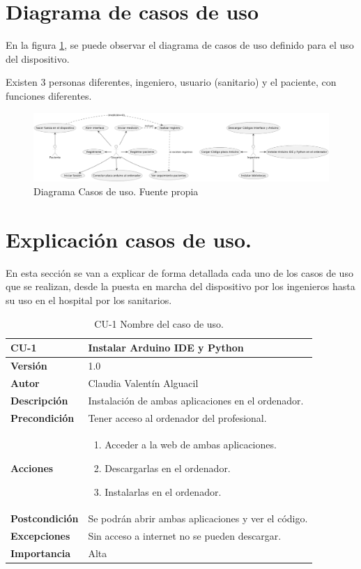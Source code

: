 \section{Diagrama de casos de uso}
En la figura \ref{fig:Diagrama Casos de uso}, se puede observar el diagrama de casos de uso definido para el uso del dispositivo. 

Existen 3 personas diferentes, ingeniero, usuario (sanitario) y el paciente, con funciones diferentes.
\begin{figure}
    \includegraphics[width=1.15\linewidth]{img/Diagrama Casos de Uso.png}
    \caption{Diagrama Casos de uso. Fuente propia}
    \label{fig:Diagrama Casos de uso}
\end{figure}
\section{Explicación casos de uso.}

En esta sección se van a explicar de forma detallada cada uno de los casos de uso que se realizan, desde la puesta en marcha del dispositivo por los ingenieros hasta su uso en el hospital por los sanitarios.

\begin{table}[p]
	\centering
	\begin{tabularx}{\linewidth}{ p{} p{} }
		\toprule
		\textbf{CU-1}    & \textbf{Instalar Arduino IDE y Python}\\
		\toprule
		\textbf{Versión}        & 1.0    \\
		\textbf{Autor}  & Claudia Valentín Alguacil \\
		\textbf{Descripción}          & Instalación de ambas aplicaciones en el ordenador. \\
		\textbf{Precondición}         & Tener acceso al ordenador del profesional. \\
		\textbf{Acciones}             &
		\begin{enumerate}
			\def\labelenumi{\arabic{enumi}.}
			\tightlist
			\item Acceder a la web de ambas aplicaciones.
			\item Descargarlas en el ordenador.
                \item Instalarlas en el ordenador.
		\end{enumerate}\\
		\textbf{Postcondición}        &  Se podrán abrir ambas aplicaciones y ver el código. \\
		\textbf{Excepciones}          & Sin acceso a internet no se pueden descargar. \\
		\textbf{Importancia}          & Alta \\
		\bottomrule
	\end{tabularx}
	\caption{CU-1 Nombre del caso de uso.}
\end{table}

